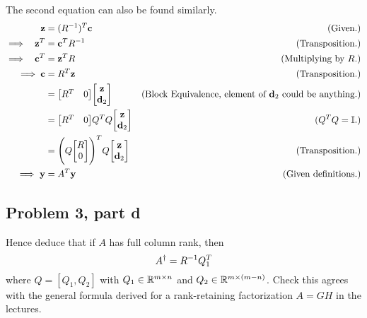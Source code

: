 \begin{solution}
    The second equation can also be found similarly. 
    \alignbreak
    \begin{align*}
        \textbf{z} &= (R^\inv)^T\textbf{c} &\text{(Given.)}\\
        \implies \ \ \textbf{z}^T &= \textbf{c}^TR^\inv &\text{(Transposition.)}\\
        \implies \ \ \textbf{c}^T &= \textbf{z}^TR &\text{(Multiplying by $R$.)}\\
        \implies  \textbf{c} &= R^T\textbf{z} &\text{(Transposition.)}\\
        &= \mqty[R^T&0] \mqty[\textbf{z}\\\textbf{d}_2] &\text{(Block Equivalence, element of $\textbf{d}_2$ could be anything.)}\\
        &= \mqty[R^T&0] Q^TQ\mqty[\textbf{z}\\\textbf{d}_2] &(Q^TQ = \id.)\\
        &= \Bigg( Q\mqty[R\\0]\Bigg)^TQ\mqty[\textbf{z}\\\textbf{d}_2] &\text{(Transposition.)}\\
        \implies \textbf{y} &= A^T\textbf{y} &\text{(Given definitions.)}
    \end{align*}
    \alignbreak
\end{solution}

\newpage
\subsection{Problem 3, part d}
Hence deduce that if $A$ has full column rank, then 
\[
A^\dag = R^{-1} Q^T_1
\]
where $Q = [Q_1, Q_2]$ with $Q_1 \in \mathbb{R}^{m\times n}$ and $Q_2 \in \mathbb{R}^{m\times (m - n)}$. Check this agrees with the general formula derived for a rank-retaining factorization $A = GH$ in the lectures. 


